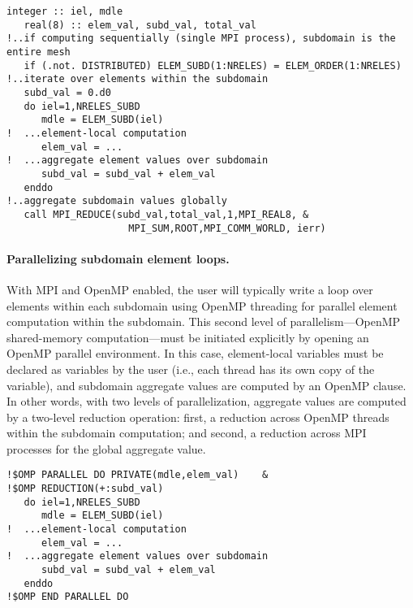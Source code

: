 \begin{lstlisting}[caption=Looping over active mesh elements in a subdomain., label={lst:subdomain_element_loop}]
   integer :: iel, mdle
   real(8) :: elem_val, subd_val, total_val
!..if computing sequentially (single MPI process), subdomain is the entire mesh
   if (.not. DISTRIBUTED) ELEM_SUBD(1:NRELES) = ELEM_ORDER(1:NRELES)
!..iterate over elements within the subdomain
   subd_val = 0.d0
   do iel=1,NRELES_SUBD
      mdle = ELEM_SUBD(iel)
!  ...element-local computation
      elem_val = ...
!  ...aggregate element values over subdomain
      subd_val = subd_val + elem_val
   enddo
!..aggregate subdomain values globally
   call MPI_REDUCE(subd_val,total_val,1,MPI_REAL8, &
                     MPI_SUM,ROOT,MPI_COMM_WORLD, ierr)
\end{lstlisting}

\paragraph{Parallelizing subdomain element loops.}
With MPI and OpenMP enabled, the user will typically write a loop over elements within each subdomain using OpenMP threading for parallel element computation within the subdomain. This second level of parallelism---OpenMP shared-memory computation---must be initiated explicitly by opening an OpenMP parallel environment. In this case, element-local variables must be declared as  variables by the user (i.e., each thread has its own copy of the variable), and subdomain aggregate values are computed by an OpenMP  clause. In other words, with two levels of parallelization, aggregate values are computed by a two-level reduction operation: first, a reduction across OpenMP threads within the subdomain computation; and second, a reduction across MPI processes for the global aggregate value.

\begin{lstlisting}[caption=Accelerating subdomain element loops by OpenMP threading., label={lst:omp_subdomain_element_loop}]
!$OMP PARALLEL DO PRIVATE(mdle,elem_val)    &
!$OMP REDUCTION(+:subd_val)
   do iel=1,NRELES_SUBD
      mdle = ELEM_SUBD(iel)
!  ...element-local computation
      elem_val = ...
!  ...aggregate element values over subdomain
      subd_val = subd_val + elem_val
   enddo
!$OMP END PARALLEL DO
\end{lstlisting}

